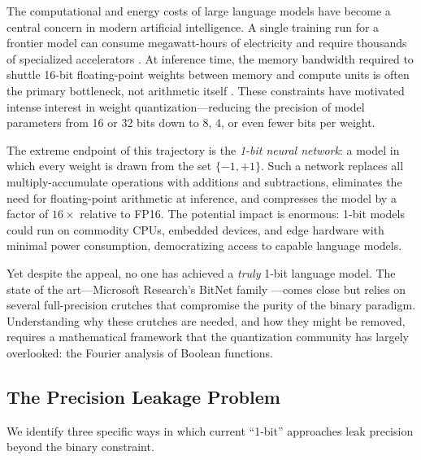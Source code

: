 \documentclass[12pt,a4paper]{article}
\theoremstyle{plain}
\theoremstyle{definition}
\theoremstyle{remark}
\newcommand{\pmone}{\{-1,+1\}}
\begin{document}
The computational and energy costs of large language models have become a central concern in modern artificial intelligence. A single training run for a frontier model can consume megawatt-hours of electricity and require thousands of specialized accelerators \citep{patterson2021carbon}. At inference time, the memory bandwidth required to shuttle 16-bit floating-point weights between memory and compute units is often the primary bottleneck, not arithmetic itself \citep{kim2023squeezellm}. These constraints have motivated intense interest in weight quantization---reducing the precision of model parameters from 16 or 32 bits down to 8, 4, or even fewer bits per weight.

The extreme endpoint of this trajectory is the \emph{1-bit neural network}: a model in which every weight is drawn from the set $\pmone$. Such a network replaces all multiply-accumulate operations with additions and subtractions, eliminates the need for floating-point arithmetic at inference, and compresses the model by a factor of $16\times$ relative to FP16. The potential impact is enormous: 1-bit models could run on commodity CPUs, embedded devices, and edge hardware with minimal power consumption, democratizing access to capable language models.

Yet despite the appeal, no one has achieved a \emph{truly} 1-bit language model. The state of the art---Microsoft Research's BitNet family \citep{wang2023bitnet, ma2024era}---comes close but relies on several full-precision crutches that compromise the purity of the binary paradigm. Understanding why these crutches are needed, and how they might be removed, requires a mathematical framework that the quantization community has largely overlooked: the Fourier analysis of Boolean functions.


\subsection{The Precision Leakage Problem}\label{sec:precision-leakage}

We identify three specific ways in which current ``1-bit'' approaches leak precision beyond the binary constraint.
\end{document}
